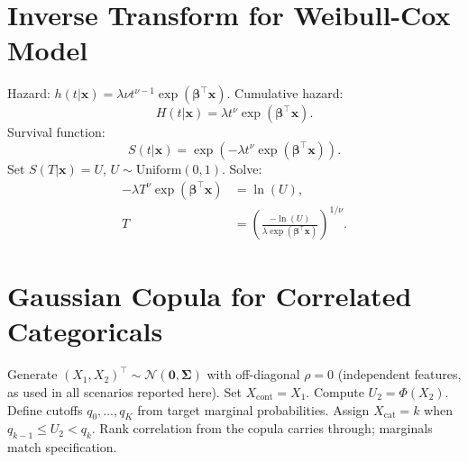 \documentclass[12pt,a4paper]{article}
\newcommand{\N}{\mathcal{N}}
\newcommand{\bx}{\bm{x}}
\newcommand{\bbeta}{\bm{\beta}}
\begin{document}



\appendix

\section{Inverse Transform for Weibull-Cox Model}

Hazard: $h(t | \bx) = \lambda \nu t^{\nu-1} \exp(\bbeta^\top \bx)$. Cumulative hazard:
\begin{equation}
    H(t | \bx) = \lambda t^\nu \exp(\bbeta^\top \bx).
\end{equation}
Survival function:
\begin{equation}
    S(t | \bx) = \exp\left(-\lambda t^\nu \exp(\bbeta^\top \bx)\right).
\end{equation}
Set $S(T | \bx) = U$, $U \sim \text{Uniform}(0,1)$. Solve:
\begin{align}
    -\lambda T^\nu \exp(\bbeta^\top \bx) &= \ln(U), \\
    T &= \left(\frac{-\ln(U)}{\lambda \exp(\bbeta^\top \bx)}\right)^{1/\nu}.
\end{align}

\section{Gaussian Copula for Correlated Categoricals}

Generate $(X_1, X_2)^\top \sim \N(\bm{0}, \bm{\Sigma})$ with off-diagonal $\rho = 0$ (independent features, as used in all scenarios reported here). Set $X_{\text{cont}} = X_1$. Compute $U_2 = \Phi(X_2)$. Define cutoffs $q_0, \ldots, q_K$ from target marginal probabilities. Assign $X_{\text{cat}} = k$ when $q_{k-1} \leq U_2 < q_k$. Rank correlation from the copula carries through; marginals match specification.
\end{document}
